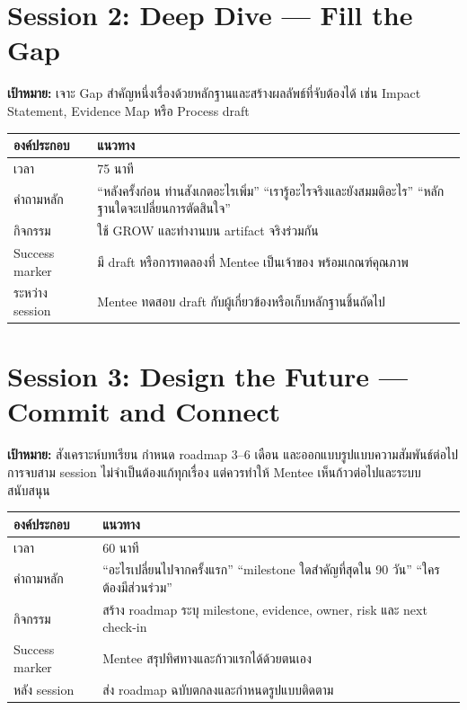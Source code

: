 \section{Session 2: Deep Dive --- Fill the Gap}
\textbf{เป้าหมาย:} เจาะ Gap สำคัญหนึ่งเรื่องด้วยหลักฐานและสร้างผลลัพธ์ที่จับต้องได้ เช่น Impact Statement, Evidence Map หรือ Process draft

\begin{longtable}{P{.23\textwidth}P{.66\textwidth}}
\toprule
\textbf{องค์ประกอบ} & \textbf{แนวทาง}\\
\midrule
เวลา & 75 นาที\\
คำถามหลัก & \enquote{หลังครั้งก่อน ท่านสังเกตอะไรเพิ่ม} \quad \enquote{เรารู้อะไรจริงและยังสมมติอะไร} \quad \enquote{หลักฐานใดจะเปลี่ยนการตัดสินใจ}\\
กิจกรรม & ใช้ GROW และทำงานบน artifact จริงร่วมกัน\\
Success marker & มี draft หรือการทดลองที่ Mentee เป็นเจ้าของ พร้อมเกณฑ์คุณภาพ\\
ระหว่าง session & Mentee ทดสอบ draft กับผู้เกี่ยวข้องหรือเก็บหลักฐานชิ้นถัดไป\\
\bottomrule
\end{longtable}

\section{Session 3: Design the Future --- Commit and Connect}
\textbf{เป้าหมาย:} สังเคราะห์บทเรียน กำหนด roadmap 3--6 เดือน และออกแบบรูปแบบความสัมพันธ์ต่อไป การจบสาม session ไม่จำเป็นต้องแก้ทุกเรื่อง แต่ควรทำให้ Mentee เห็นก้าวต่อไปและระบบสนับสนุน

\begin{longtable}{P{.23\textwidth}P{.66\textwidth}}
\toprule
\textbf{องค์ประกอบ} & \textbf{แนวทาง}\\
\midrule
เวลา & 60 นาที\\
คำถามหลัก & \enquote{อะไรเปลี่ยนไปจากครั้งแรก} \quad \enquote{milestone ใดสำคัญที่สุดใน 90 วัน} \quad \enquote{ใครต้องมีส่วนร่วม}\\
กิจกรรม & สร้าง roadmap ระบุ milestone, evidence, owner, risk และ next check-in\\
Success marker & Mentee สรุปทิศทางและก้าวแรกได้ด้วยตนเอง\\
หลัง session & ส่ง roadmap ฉบับตกลงและกำหนดรูปแบบติดตาม\\
\bottomrule
\end{longtable}

